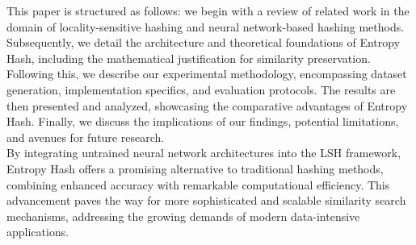 \documentclass{article}
\begin{document}
This paper is structured as follows: we begin with a review of related work in the domain of locality-sensitive hashing and neural network-based hashing methods. Subsequently, we detail the architecture and theoretical foundations of Entropy Hash, including the mathematical justification for similarity preservation. Following this, we describe our experimental methodology, encompassing dataset generation, implementation specifics, and evaluation protocols. The results are then presented and analyzed, showcasing the comparative advantages of Entropy Hash. Finally, we discuss the implications of our findings, potential limitations, and avenues for future research.\\
By integrating untrained neural network architectures into the LSH framework, Entropy Hash offers a promising alternative to traditional hashing methods, combining enhanced accuracy with remarkable computational efficiency. This advancement paves the way for more sophisticated and scalable similarity search mechanisms, addressing the growing demands of modern data-intensive applications.\\
\end{document}
